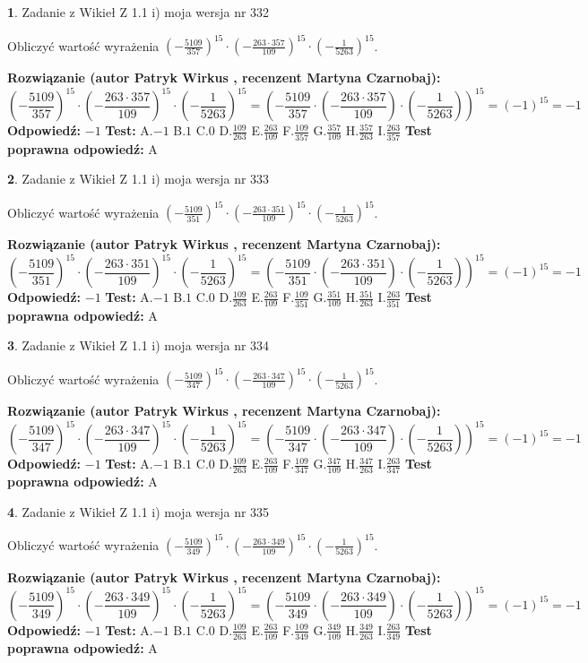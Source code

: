 \documentclass[12pt, a4paper]{article}
\theoremstyle{definition} %
\newtheorem{zad}{}
\newcommand{\zadStart}[1]{\begin{zad}#1\newline}
\newcommand{\zadStop}{\end{zad}}
\newcommand{\rozwStart}[2]{\noindent \textbf{Rozwiązanie (autor #1 , recenzent #2): }\newline}
\newcommand{\rozwStop}{\newline}
\newcommand{\odpStart}{\noindent \textbf{Odpowiedź:}\newline}
\newcommand{\odpStop}{\newline}
\newcommand{\testStart}{\noindent \textbf{Test:}\newline}
\newcommand{\testStop}{\newline}
\newcommand{\kluczStart}{\noindent \textbf{Test poprawna odpowiedź:}\newline}
\newcommand{\kluczStop}{\newline}
\begin{document}
\zadStart{Zadanie z Wikieł Z 1.1 i) moja wersja nr 332}

Obliczyć wartość wyrażenia $(-\frac{5109}{357})^{15} \cdot (-\frac{263 \cdot 357}{109})^{15} \cdot (-\frac{1}{5263})^{15}$.
\zadStop
\rozwStart{Patryk Wirkus}{Martyna Czarnobaj}
$$(-\frac{5109}{357})^{15} \cdot (-\frac{263 \cdot 357}{109})^{15} \cdot (-\frac{1}{5263})^{15} = (-\frac{5109}{357} \cdot (-\frac{263 \cdot 357}{109}) \cdot (-\frac{1}{5263}))^{15} = (-1)^{15} = -1$$
\rozwStop
\odpStart
$-1$
\odpStop
\testStart
A.$-1$ B.$1$ C.$0$ D.$\frac{109}{263}$ E.$\frac{263}{109}$
F.$\frac{109}{357}$ G.$\frac{357}{109}$
H.$\frac{357}{263}$
I.$\frac{263}{357}$
\testStop
\kluczStart
A
\kluczStop



\zadStart{Zadanie z Wikieł Z 1.1 i) moja wersja nr 333}

Obliczyć wartość wyrażenia $(-\frac{5109}{351})^{15} \cdot (-\frac{263 \cdot 351}{109})^{15} \cdot (-\frac{1}{5263})^{15}$.
\zadStop
\rozwStart{Patryk Wirkus}{Martyna Czarnobaj}
$$(-\frac{5109}{351})^{15} \cdot (-\frac{263 \cdot 351}{109})^{15} \cdot (-\frac{1}{5263})^{15} = (-\frac{5109}{351} \cdot (-\frac{263 \cdot 351}{109}) \cdot (-\frac{1}{5263}))^{15} = (-1)^{15} = -1$$
\rozwStop
\odpStart
$-1$
\odpStop
\testStart
A.$-1$ B.$1$ C.$0$ D.$\frac{109}{263}$ E.$\frac{263}{109}$
F.$\frac{109}{351}$ G.$\frac{351}{109}$
H.$\frac{351}{263}$
I.$\frac{263}{351}$
\testStop
\kluczStart
A
\kluczStop



\zadStart{Zadanie z Wikieł Z 1.1 i) moja wersja nr 334}

Obliczyć wartość wyrażenia $(-\frac{5109}{347})^{15} \cdot (-\frac{263 \cdot 347}{109})^{15} \cdot (-\frac{1}{5263})^{15}$.
\zadStop
\rozwStart{Patryk Wirkus}{Martyna Czarnobaj}
$$(-\frac{5109}{347})^{15} \cdot (-\frac{263 \cdot 347}{109})^{15} \cdot (-\frac{1}{5263})^{15} = (-\frac{5109}{347} \cdot (-\frac{263 \cdot 347}{109}) \cdot (-\frac{1}{5263}))^{15} = (-1)^{15} = -1$$
\rozwStop
\odpStart
$-1$
\odpStop
\testStart
A.$-1$ B.$1$ C.$0$ D.$\frac{109}{263}$ E.$\frac{263}{109}$
F.$\frac{109}{347}$ G.$\frac{347}{109}$
H.$\frac{347}{263}$
I.$\frac{263}{347}$
\testStop
\kluczStart
A
\kluczStop



\zadStart{Zadanie z Wikieł Z 1.1 i) moja wersja nr 335}

Obliczyć wartość wyrażenia $(-\frac{5109}{349})^{15} \cdot (-\frac{263 \cdot 349}{109})^{15} \cdot (-\frac{1}{5263})^{15}$.
\zadStop
\rozwStart{Patryk Wirkus}{Martyna Czarnobaj}
$$(-\frac{5109}{349})^{15} \cdot (-\frac{263 \cdot 349}{109})^{15} \cdot (-\frac{1}{5263})^{15} = (-\frac{5109}{349} \cdot (-\frac{263 \cdot 349}{109}) \cdot (-\frac{1}{5263}))^{15} = (-1)^{15} = -1$$
\rozwStop
\odpStart
$-1$
\odpStop
\testStart
A.$-1$ B.$1$ C.$0$ D.$\frac{109}{263}$ E.$\frac{263}{109}$
F.$\frac{109}{349}$ G.$\frac{349}{109}$
H.$\frac{349}{263}$
I.$\frac{263}{349}$
\testStop
\kluczStart
A
\kluczStop
\end{document}
